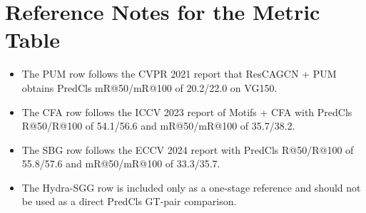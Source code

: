 \documentclass[11pt]{article}
\begin{document}
\section{Reference Notes for the Metric Table}
\begin{itemize}[leftmargin=1.5em]
  \item The PUM row follows the CVPR 2021 report that ResCAGCN + PUM obtains PredCls mR@50/mR@100 of 20.2/22.0 on VG150.
  \item The CFA row follows the ICCV 2023 report of Motifs + CFA with PredCls R@50/R@100 of 54.1/56.6 and mR@50/mR@100 of 35.7/38.2.
  \item The SBG row follows the ECCV 2024 report with PredCls R@50/R@100 of 55.8/57.6 and mR@50/mR@100 of 33.3/35.7.
  \item The Hydra-SGG row is included only as a one-stage reference and should not be used as a direct PredCls GT-pair comparison.
\end{itemize}
\end{document}
